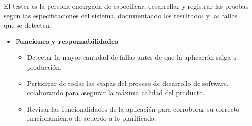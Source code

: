         El tester es la persona encargada de especificar, desarrollar y registrar las pruebas según las especificaciones del sistema, documentando los resultados y las fallas que se detecten.
			\begin{itemize}
			    \item \textbf{Funciones y responsabilidades}
            	
                \begin{itemize}
				    \item Detectar la mayor cantidad de fallas antes de que la aplicación salga a producción.
                    \item Participar de todas las etapas del proceso de desarrollo de software, colaborando para asegurar la máxima calidad del producto.
                    \item Revisar las funcionalidades de la aplicación para corroborar su correcto funcionamiento de acuerdo a lo planificado.
				\end{itemize}
            

\end{itemize}
